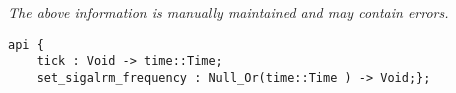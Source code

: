 \label{api:Set\_Sigalrm\_Frequency}

{\tiny \it The above information is manually maintained and may contain errors.}
\begin{verbatim}
api {
    tick : Void -> time::Time;
    set_sigalrm_frequency : Null_Or(time::Time ) -> Void;};
\end{verbatim}
